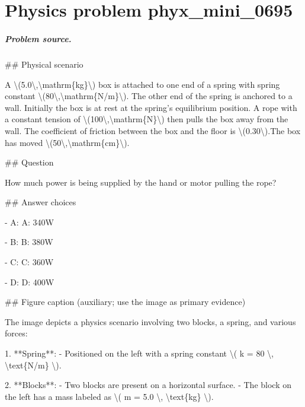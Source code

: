 
\chapter{Physics problem phyx\_mini\_0695}
\label{ch:PhyXMiniProblems_problem_phyx_mini_0695}

\paragraph{Problem source.}
\#\# Physical scenario

A \textbackslash{}(5.0\textbackslash{},\textbackslash{}mathrm\{kg\}\textbackslash{}) box is attached to one end of a spring with spring constant \textbackslash{}(80\textbackslash{},\textbackslash{}mathrm\{N/m\}\textbackslash{}). The other end of the spring is anchored to a wall. Initially the box is at rest at the spring's equilibrium position. A rope with a constant tension of \textbackslash{}(100\textbackslash{},\textbackslash{}mathrm\{N\}\textbackslash{}) then pulls the box away from the wall. The coefficient of friction between the box and the floor is \textbackslash{}(0.30\textbackslash{}).The box has moved \textbackslash{}(50\textbackslash{},\textbackslash{}mathrm\{cm\}\textbackslash{}).

\#\# Question

How much power is being supplied by the hand or motor pulling the rope?

\#\# Answer choices

- A: A: 340W

- B: B: 380W

- C: C: 360W

- D: D: 400W

\#\# Figure caption (auxiliary; use the image as primary evidence)

The image depicts a physics scenario involving two blocks, a spring, and various forces:

1. **Spring**:
   - Positioned on the left with a spring constant \textbackslash{}( k = 80 \textbackslash{}, \textbackslash{}text\{N/m\} \textbackslash{}).

2. **Blocks**:
   - Two blocks are present on a horizontal surface.
   - The block on the left has a mass labeled as \textbackslash{}( m = 5.0 \textbackslash{}, \textbackslash{}text\{kg\} \textbackslash{}).

